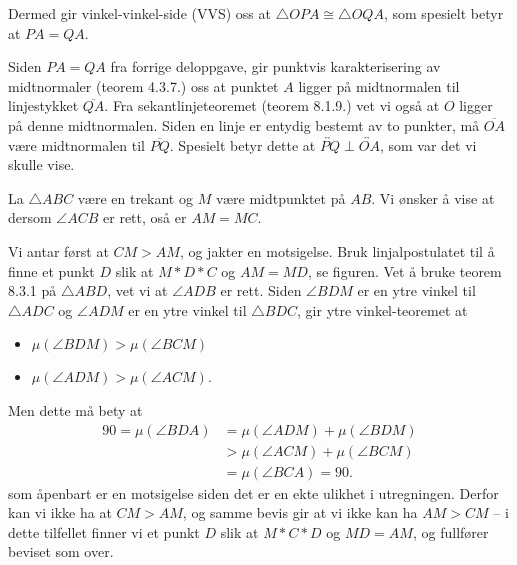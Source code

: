 \begin{oppgave}[8.1.6]
\begin{punkt}
        Dermed gir vinkel-vinkel-side (VVS) oss at $\triangle OPA\cong \triangle OQA$, som spesielt betyr at $PA=QA$. 
    \end{punkt}

    \begin{punkt}
        Siden $PA=QA$ fra forrige deloppgave, gir punktvis karakterisering av midtnormaler (teorem 4.3.7.) oss at punktet $A$ ligger på midtnormalen til linjestykket $\overline{QA}$. 
        Fra sekantlinjeteoremet (teorem 8.1.9.) vet vi også at $O$ ligger på denne midtnormalen. 
        Siden en linje er entydig bestemt av to punkter, må $\overline{OA}$ være midtnormalen til $\overline{PQ}$. 
        Spesielt betyr dette at $\overleftrightarrow{PQ}\perp \overleftrightarrow{OA}$, som var det vi skulle vise. 
    \end{punkt}

\end{oppgave}

\begin{oppgave}[8.3.1]
    La $\triangle ABC$ være en trekant og $M$ være midtpunktet på $AB$. 
    Vi ønsker å vise at dersom $\angle ACB$ er rett, oså er $AM = MC$. 
    
    Vi antar først at $CM > AM$, og jakter en motsigelse. 
    Bruk linjalpostulatet til å finne et punkt $D$ slik at $M \ast D \ast C$ og $AM = MD$, se figuren. 
    Vet å bruke teorem 8.3.1 på $\triangle ABD$, vet vi at $\angle ADB$ er rett. 
    Siden $\angle BDM$ er en ytre vinkel til $\triangle ADC$ og $\angle ADM$ er en ytre vinkel til $\triangle BDC$, gir ytre vinkel-teoremet at
    \begin{itemize}
        \item $\mu(\angle BDM)>\mu(\angle BCM)$
        \item $\mu(\angle ADM)>\mu(\angle ACM)$.
    \end{itemize}
    Men dette må bety at 
    \begin{align*}
        90 = \mu(\angle BDA) 
        &= \mu(\angle ADM) + \mu(\angle BDM) \\
        &> \mu(\angle ACM) + \mu(\angle BCM) \\
        &= \mu(\angle BCA) = 90.
    \end{align*}
    som åpenbart er en motsigelse siden det er en ekte ulikhet i utregningen. 
    Derfor kan vi ikke ha at $CM > AM$, og samme bevis gir at vi ikke kan ha $AM > CM$ -- 
    i dette tilfellet finner vi et punkt $D$ slik at $M \ast C \ast D$ og $MD = AM$, og fullfører beviset som over.

    \begin{figure}[H]
        \centering
         
    \end{figure}
\end{oppgave}

